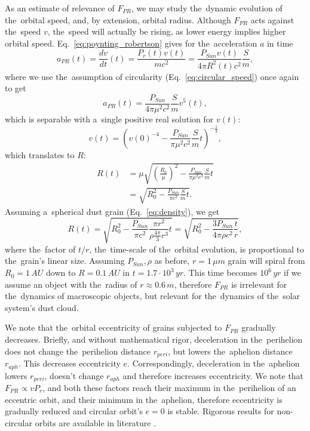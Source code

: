 As an estimate of relevance of $F_{PR}$, we may study the~dynamic evolution of the~orbital speed, and, by extension, orbital radius. Although $F_{PR}$ acts against the~speed $v$, the~speed will actually be rising, as lower energy implies higher orbital speed. Eq.~\ref{eq:poynting_robertson} gives for the~acceleration $a$ in time
\begin{equation}
    a_{PR}(t) = \frac{dv}{dt}(t) = \frac{P_{r}(t)v(t)}{mc^2} = \frac{P_{Sun} v(t) }{4 \pi R^2(t) c^2} \frac{S}{m},
\end{equation}
where we use the~assumption of circularity (Eq.~\ref{eq:circular_speed}) once again to get
\begin{equation}
    a_{PR}(t) = \frac{P_{Sun}}{4 \pi \mu^2 c^2} \frac{S}{m} v^5(t),
\end{equation}
which is separable with a~single positive real solution for $v(t)$:
\begin{equation}
    v(t) = \left( v(0)^{-4} - \frac{P_{Sun}}{\pi \mu^2 c^2} \frac{S}{m} t \right)^{-\frac{1}{4}},
\end{equation}
which translates to $R$:
\begin{equation}\begin{split}
    R(t) &=  \mu \sqrt{ \left(\frac{R_0}{\mu}\right)^{2} - \frac{P_{Sun}}{\pi \mu^2 c^2} \frac{S}{m} t }
    \\ &= \sqrt{R_0^2 - \frac{P_{Sun}}{\pi c^2} \frac{S}{m} t }.
\end{split}\end{equation}
Assuming a~spherical dust grain (Eq.~\ref{eq:density}), we get
\begin{equation}
    R(t) = \sqrt{R_0^2 - \frac{P_{Sun}}{\pi c^2} \frac{\pi r^2}{\rho \frac{4\pi}{3} r^3} t } = \sqrt{R_0^2 - \frac{3P_{Sun}}{4 \pi \rho c^2} \frac{t}{r} },
    \label{eq:PR_estimate}
\end{equation}
where the~factor of $t/r$, the~time-scale of the~orbital evolution, is proportional to the~grain's linear size. Assuming $P_{Sun},\rho$ as before, $r=1\,\si{\mu m}$ grain will spiral from $R_0=1\,\si{AU}$ down to $R=0.1\,\si{AU}$ in $t=1.7 \cdot 10^3\,\si{yr}$. This time becomes $10^6\,\si{yr}$ if we assume an object with the~radius of $r \approx 0.6 \, \si{m}$, therefore $F_{PR}$ is irrelevant for the~dynamics of macroscopic objects, but relevant for the~dynamics of the~solar system's dust cloud. 

We note that the~orbital eccentricity of grains subjected to $F_{PR}$ gradually decreases. Briefly, and without mathematical rigor, deceleration in the~perihelion does not change the~perihelion distance $r_{peri}$, but lowers the~aphelion distance $r_{aph}$. This decreases eccentricity $e$. Correspondingly, deceleration in the~aphelion lowers $r_{peri}$, doesn't change $r_{aph}$ and therefore increases eccentricity. We note that $F_{PR} \propto v P_r$, and both these factors reach their maximum in the~perihelion of an eccentric orbit, and their minimum in the~aphelion, therefore eccentricity is gradually reduced and circular orbit's $e=0$ is stable. Rigorous results for non-circular orbits are available in literature \citep{wyatt1950poynting}. 

